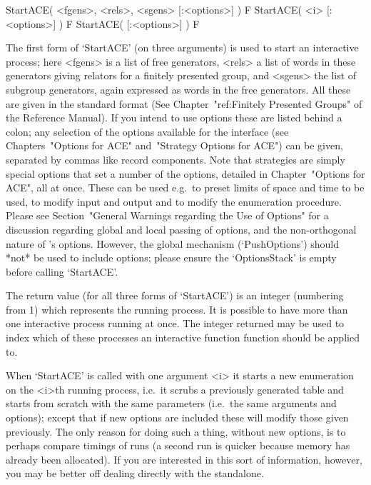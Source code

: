 
\>StartACE( <fgens>, <rels>, <sgens> [:<options>] ) F
\>StartACE( <i> [:<options>] ) F
\>StartACE( [:<options>] ) F

The first form of `StartACE' (on three arguments) is used to start  an
interactive process; here <fgens> is a list of free generators, <rels>
a list of words in these generators giving  relators  for  a  finitely
presented group, and <sgens> the list of  subgroup  generators,  again
expressed as words in the free generators. All these are given in  the
standard {\GAP} format (See Chapter~"ref:Finitely Presented Groups" of
the {\GAP} Reference Manual). If you intend to use options  these  are
listed behind a colon; any selection of the options available for  the
interface (see Chapters~"Options for ACE"  and~"Strategy  Options  for
ACE") can be given, separated by commas like record  components.  Note
that strategies are simply special options that set a  number  of  the
options, detailed in Chapter~"Options for ACE", all at once. These can
be used e.g.~to preset limits of space and time to be used, to  modify
input and output and to modify the enumeration procedure.  Please  see
Section~"General  Warnings  regarding  the  Use  of  Options"  for   a
discussion regarding global and local  passing  of  options,  and  the
non-orthogonal  nature  of  {\ACE}'s  options.  However,  the   global
mechanism (`PushOptions') should *not* be  used  to  include  options;
please ensure the `OptionsStack' is empty before calling `StartACE'.

The return value (for all three forms of  `StartACE')  is  an  integer
(numbering from  1)  which  represents  the  running  process.  It  is
possible to have more than one interactive process  running  at  once.
The integer returned may be used to index which of these processes  an
interactive function {\ACE} function should be applied to.

When `StartACE' is called with  one  argument  <i>  it  starts  a  new
enumeration on the <i>th running process, i.e.~it scrubs a  previously
generated table and starts  from  scratch  with  the  same  parameters
(i.e.~the same arguments and options); except that if new options  are
included these will modify those given previously. The only reason for
doing such a thing, without new options, is to perhaps compare timings
of runs (a second run is  quicker  because  memory  has  already  been
allocated). If  you  are  interested  in  this  sort  of  information,
however, you may be better off dealing directly with the standalone.

